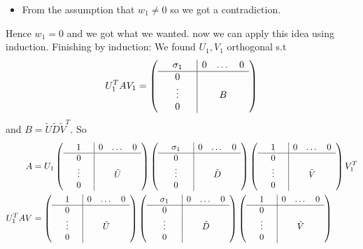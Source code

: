 \begin{itemize}
\item From the assumption that $w_{1}\ne0$ so we got a contradiction.
\end{itemize}
Hence $w_{1}=0$ and we got what we wanted. now we can apply this
idea using induction. Finishing by induction: We found $U_{1},V_{1}$
orthogonal s.t 
\[
U_{1}^{T}AV_{1}=\left(\begin{array}{ccc|ccc}
 & \sigma_{1} &  & 0 & \dots & 0\\
\hline  & 0 & \\
 & \vdots &  &  & B\\
 & 0 & 
\end{array}\right)
\]
 and $B=\tilde{U}\tilde{D}\tilde{V}^{T}$. So 
\begin{align*}
A & =U_{1}\left(\begin{array}{ccc|ccc}
 & 1 &  & 0 & \dots & 0\\
\hline  & 0 & \\
 & \vdots &  &  & \tilde{U}\\
 & 0 & 
\end{array}\right)\left(\begin{array}{ccc|ccc}
 & \sigma_{1} &  & 0 & \dots & 0\\
\hline  & 0 & \\
 & \vdots &  &  & \tilde{D}\\
 & 0 & 
\end{array}\right)\left(\begin{array}{ccc|ccc}
 & 1 &  & 0 & \dots & 0\\
\hline  & 0 & \\
 & \vdots &  &  & \tilde{V}\\
 & 0 & 
\end{array}\right)V_{1}^{T}\\
U_{1}^{T}AV & =\left(\begin{array}{ccc|ccc}
 & 1 &  & 0 & \dots & 0\\
\hline  & 0 & \\
 & \vdots &  &  & \tilde{U}\\
 & 0 & 
\end{array}\right)\left(\begin{array}{ccc|ccc}
 & \sigma_{1} &  & 0 & \dots & 0\\
\hline  & 0 & \\
 & \vdots &  &  & \tilde{D}\\
 & 0 & 
\end{array}\right)\left(\begin{array}{ccc|ccc}
 & 1 &  & 0 & \dots & 0\\
\hline  & 0 & \\
 & \vdots &  &  & \tilde{V}\\
 & 0 & 
\end{array}\right)
\end{align*}
